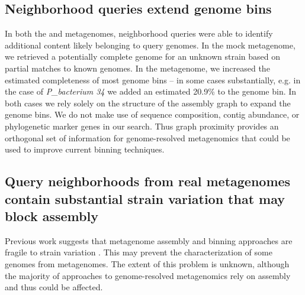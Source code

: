 %
%
%

\subsection*{Neighborhood queries extend genome bins}

In both the \podarv and \hu metagenomes, neighborhood queries were
able to identify additional content likely belonging to query genomes.
In the \podarv mock metagenome, we retrieved a potentially complete
genome for an unknown strain based on partial matches to known
genomes. In the \hu metagenome, we increased the estimated
completeness of most genome bins -- in some cases substantially,
e.g. in the case of {\em P_bacterium 34}
we added an estimated 20.9\% to the genome bin.  In both cases we rely
solely on the structure of the assembly graph to expand the genome
bins. We do not make use of sequence composition, contig abundance, or
phylogenetic marker genes in our search. Thus graph proximity provides
an orthogonal set of information for genome-resolved metagenomics that
could be used to improve current binning techniques.

\subsection*{Query neighborhoods from real metagenomes contain substantial strain variation that may block assembly}

Previous work suggests that metagenome assembly and binning
approaches are fragile to strain variation \cite{CAMI,Awad155358}. This may
prevent the characterization of some genomes from metagenomes.  The extent of this problem is unknown, although
the majority of approaches to genome-resolved metagenomics rely on
assembly and thus could be affected.

